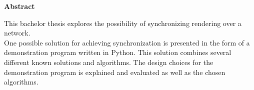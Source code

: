 \mbox{}
\vspace{3cm}
\begin{center}
\begin{minipage}[center]{0.80\textwidth}

\begin{center}
{\normalsize \textbf{Abstract}}
\end{center}
This bachelor thesis explores the possibility of synchronizing rendering over a network. 
\\

One possible solution for achieving synchronization is presented in the form of a demonstration program written in Python. This solution combines several different known solutions and algorithms. The design choices for the demonstration program is explained and evaluated as well as the chosen algorithms. 
\end{minipage}
\end{center}
